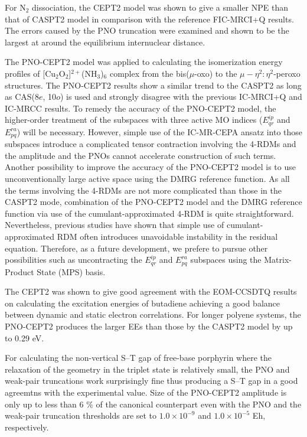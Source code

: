 \documentclass[aip,jcp,amsmath]{revtex4-1}
\begin{document}
%
For N${}_2$ dissociation, the CEPT2 model was shown to give a smaller NPE than that of CASPT2 model in comparison with the reference FIC-MRCI+Q results.
%
The errors caused by the PNO truncation were examined and shown to be the largest at around the equilibrium internuclear distance.

%
The PNO-CEPT2 model was applied to calculating the isomerization energy profiles of [Cu${}_2$O${}_2$]${}^{2+}$(NH${}_3$)${}_{6}$ complex from the bis($\mu$-oxo) to the $\mu-\eta^2:\eta^2$-peroxo structures.
%
The PNO-CEPT2 results show a similar trend to the CASPT2 as long as CAS(8$e$, 10$o$) is used and strongly disagree with the previous IC-MRCI+Q and IC-MRCC results.
%
To remedy the accuracy of the PNO-CEPT2 model, the higher-order treatment of the subspaces with three active MO indices ($E^{ip}_{qr}$ and $E^{ra}_{pq}$) will be necessary.
%
However, simple use of the IC-MR-CEPA ansatz into those subspaces introduce a complicated tensor contraction involving the 4-RDMs and the amplitude and the PNOs cannot accelerate construction of such terms.
%
Another possibility to improve the accuracy of the PNO-CEPT2 model is to use unconventionally large active space using the DMRG reference function.
%
As all the terms involving the 4-RDMs are not more complicated than those in the CASPT2 mode, combination of the PNO-CEPT2 model and the DMRG reference function via use of the cumulant-approximated 4-RDM is quite straightforward.
%
Nevertheless, previous studies have shown that simple use of cumulant-approximated RDM often introduces unavoidable instability in the residual equation.
%
Therefore, as a future development, we prefere to pursue other possibilities such as uncontracting the $E^{ip}_{qr}$ and $E^{ra}_{pq}$ subspaces using the Matrix-Product State (MPS) basis.

%
The CEPT2 was shown to give good agreement with the EOM-CCSDTQ results on calculating the excitation energies of butadiene achieving a good balance between dynamic and static electron correlations.
%
For longer polyene systems, the PNO-CEPT2 produces the larger EEs than those by the CASPT2 model by up to 0.29 eV.

%
For calculating the non-vertical S--T gap of free-base porphyrin where the relaxation of the geometry in the triplet state is relatively small, the PNO and weak-pair truncations work surprisingly fine thus producing a S--T gap in a good agreemtns with the experimental value.
%
Size of the PNO-CEPT2 amplitude is only up to less than 6 $\%$ of the canonical counterpart even with the PNO and the weak-pair truncation thresholds are set to $1.0\times10^{-9}$ and $1.0\times 10^{-5}$ Eh, respectively.
\end{document}

